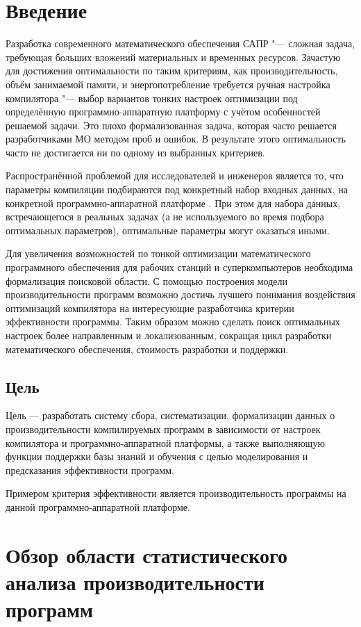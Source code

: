 \section{Введение}
Разработка современного математического обеспечения САПР "--- сложная задача, требующая больших вложений материальных и временных ресурсов. Зачастую для достижения оптимальности по таким критериям, как производительность, объём занимаемой памяти, и энергопотребление требуется ручная настройка компилятора "--- выбор вариантов тонких настроек оптимизации под определённую программно-аппаратную платформу с учётом особенностей решаемой задачи. Это плохо формализованная задача, которая часто решается разработчиками МО методом проб и ошибок. В результате этого оптимальность часто не достигается ни по одному из выбранных критериев.

Распространённой проблемой для исследователей и инженеров является то, что параметры компиляции подбираются под конкретный набор входных данных, на конкретной программно-аппаратной платформе \cite{Jimenez:2008:PRC:1505816.1505822,luo:inria-00436034}. При этом для набора данных, встречающегося в реальных задачах (а не используемого во время подбора оптимальных параметров), оптимальные параметры могут оказаться иными.

Для увеличения возможностей по тонкой оптимизации математического программного обеспечения для рабочих станций и суперкомпьютеров необходима формализация поисковой области. С помощью построения модели производительности программ возможно достичь лучшего понимания воздействия оптимизаций компилятора на интересующие разработчика критерии эффективности программы. Таким образом можно сделать поиск оптимальных настроек более направленным и локализованным, сокращая цикл разработки математического обеспечения, стоимость разработки и поддержки.


\subsection{Цель}
Цель — разработать систему сбора, систематизации, формализации данных о производительности компилируемых программ в зависимости от настроек компилятора и программно-аппаратной платформы, а также выполняющую функции поддержки базы знаний и обучения с целью моделирования и предсказания эффективности программ.

Примером критерия эффективности является производительность программы на данной программно-аппаратной платформе.


\section{Обзор области статистического анализа производительности программ}
